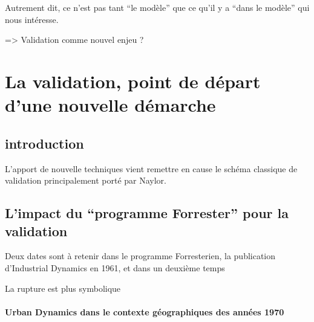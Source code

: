 Autrement dit, ce n'est pas tant \enquote{le modèle} que ce qu'il y a \enquote{dans le modèle} qui nous intéresse. \autocite{Sanders2000} 

=> Validation comme nouvel enjeu ?

\section{La validation, point de départ d'une nouvelle démarche}
\label{sec:validation}

\subsection{introduction}




L'apport de nouvelle techniques vient remettre en cause le schéma classique de validation principalement porté par Naylor.

\subsection{L'impact du \enquote{programme Forrester} pour la validation}

Deux dates sont à retenir dans le programme Forresterien, la publication d'Industrial Dynamics en 1961, et dans un deuxième temps 

La rupture est plus symbolique 

\paragraph{Urban Dynamics dans le contexte géographiques des années 1970}

